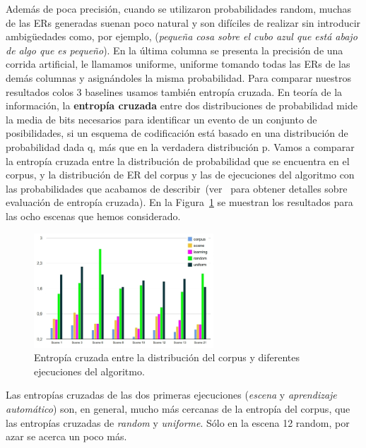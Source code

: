 \begin{table}[H]
Adem\'as de poca precisi\'on, cuando se utilizaron probabilidades random,  muchas de las ERs generadas suenan poco natural y son dif\'iciles de realizar sin introducir ambig\"uedades como, por ejemplo, (\textit{peque\~na cosa sobre
el cubo azul que est\'a abajo de algo que es peque\~no}). En la \'ultima columna se presenta la precisi\'on de una corrida artificial, le llamamos uniforme, uniforme tomando todas las ERs de las dem\'as columnas y asign\'andoles la misma probabilidad.
Para comparar nuestros resultados colos 3 baselines usamos tambi\'en entrop\'ia cruzada.
En teor\'ia de la informaci\'on, la \textbf{entrop\'ia cruzada} entre dos distribuciones de probabilidad mide la media de bits necesarios para identificar un evento de un conjunto de posibilidades, si un esquema de codificaci\'on est\'a basado en una distribuci\'on de probabilidad dada q, m\'as que en la verdadera distribuci\'on p. Vamos a comparar la entrop\'ia cruzada entre la distribuci\'on de probabilidad que se encuentra en el corpus, y la distribuci\'on de ER del corpus y las de ejecuciones del algoritmo con las probabilidades que acabamos de describir~(ver~\cite{juraksky:spee08} para obtener detalles sobre evaluaci\'on de entrop\'{i}a cruzada). En la Figura~\ref{Entropy} se muestran los resultados para las ocho escenas que hemos considerado.

\begin{figure}[ht]
\centering
\includegraphics[width=0.6\textwidth]{images/entropy.jpg}
\caption{Entrop\'ia cruzada entre la distribuci\'on del corpus y diferentes ejecuciones del algoritmo.}\label{Entropy}
\end{figure}
  
Las entrop\'{i}as cruzadas de las dos primeras ejecuciones (\emph{escena} y \emph{aprendizaje autom\'atico}) son, en general, mucho m\'as cercanas de la entrop\'{i}a del corpus, que las entrop\'ias cruzadas de \emph{random} y \emph{uniforme}. S\'olo en la escena 12 random, por azar se acerca un poco m\'as.




\end{table}
